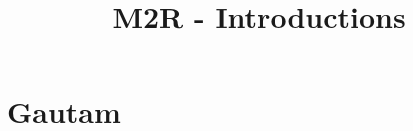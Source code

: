 \documentclass{article}
\title{M2R - Introductions}
\begin{document}
\maketitle

\section{Gautam}
\label{sec:1}
\end{document}
